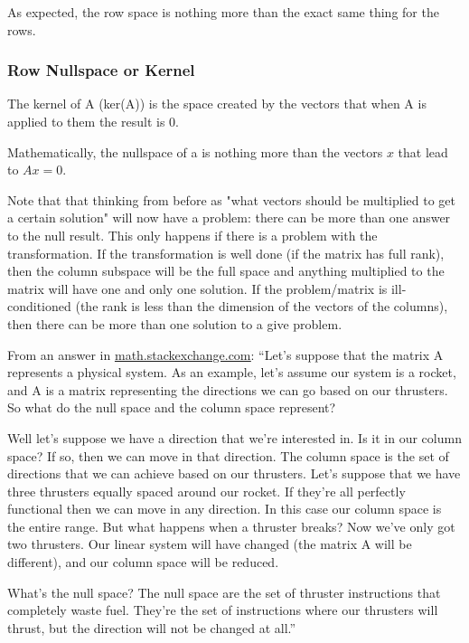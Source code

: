 
\par As expected, the row space is nothing more than the exact same thing for the rows. 

\subsubsection{Row Nullspace or Kernel}

\par The kernel of A (ker(A)) is the space created by the vectors that when A is applied to them the result is 0.
\par Mathematically, the nullspace of a is nothing more than the vectors $x$ that lead to $A x = 0$. 
\par Note that that thinking from before as "what vectors should be multiplied to get a certain solution" will now have a problem: there can be more than one answer to the null result. This only happens if there is a problem with the transformation. If the transformation is well done (if the matrix has full rank), then the column subspace will be the full space and anything multiplied to the matrix will have one and only one solution. If the problem/matrix is ill-conditioned (the rank is less than the dimension of the vectors of the columns), then there can be more than one solution to a give problem. 


\Vhrulefill
From an answer in \href{https://math.stackexchange.com/questions/987146/why-null-space-and-column-space/987657#987657}{\uline{math.stackexchange.com}}: 
``Let's suppose that the matrix A represents a physical system. As an example, let's assume our system is a rocket, and A is a matrix representing the directions we can go based on our thrusters. So what do the null space and the column space represent?

Well let's suppose we have a direction that we're interested in. Is it in our column space? If so, then we can move in that direction. The column space is the set of directions that we can achieve based on our thrusters. Let's suppose that we have three thrusters equally spaced around our rocket. If they're all perfectly functional then we can move in any direction. In this case our column space is the entire range. But what happens when a thruster breaks? Now we've only got two thrusters. Our linear system will have changed (the matrix A will be different), and our column space will be reduced.

What's the null space? The null space are the set of thruster instructions that completely waste fuel. They're the set of instructions where our thrusters will thrust, but the direction will not be changed at all.''

